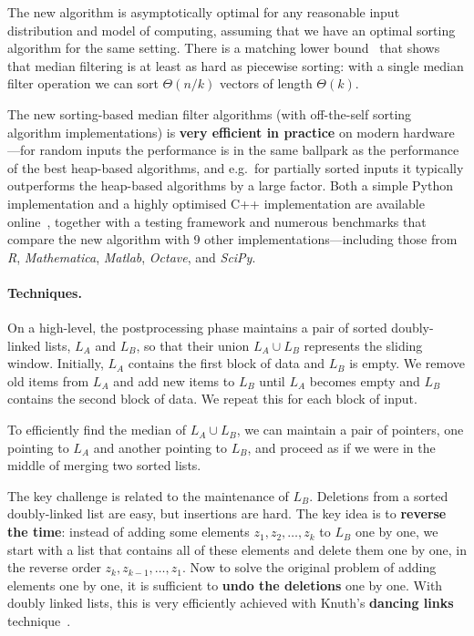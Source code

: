 \documentclass[a4paper,11pt]{article}
\begin{document}
The new algorithm is asymptotically optimal for any reasonable input distribution and model of computing, assuming that we have an optimal sorting algorithm for the same setting. There is a matching lower bound~\cite{juhola91comparison,krizanc05range-mode} that shows that median filtering is at least as hard as piecewise sorting: with a single median filter operation we can sort $\Theta(n/k)$ vectors of length $\Theta(k)$.

The new sorting-based median filter algorithms (with off-the-self sorting algorithm implementations) is \textbf{very efficient in practice} on modern hardware---for random inputs the performance is in the same ballpark as the performance of the best heap-based algorithms, and e.g.\ for partially sorted inputs it typically outperforms the heap-based algorithms by a large factor. Both a simple Python implementation and a highly optimised C++ implementation are available online~, together with a testing framework and numerous benchmarks that compare the new algorithm with 9 other implementations---including those from \emph{R}, \emph{Mathematica}, \emph{Matlab}, \emph{Octave}, and \emph{SciPy}.

\paragraph{Techniques.}

On a high-level, the postprocessing phase maintains a pair of sorted doubly-linked lists, $L_A$ and $L_B$, so that their union $L_A \cup L_B$ represents the sliding window. Initially, $L_A$ contains the first block of data and $L_B$ is empty. We remove old items from $L_A$ and add new items to $L_B$ until $L_A$ becomes empty and $L_B$ contains the second block of data. We repeat this for each block of input.

To efficiently find the median of $L_A \cup L_B$, we can maintain a pair of pointers, one pointing to $L_A$ and another pointing to $L_B$, and proceed as if we were in the middle of merging two sorted lists.

The key challenge is related to the maintenance of $L_B$. Deletions from a sorted doubly-linked list are easy, but insertions are hard. The key idea is to \textbf{reverse the time}: instead of adding some elements $z_1, z_2, \dotsc, z_k$ to $L_B$ one by one, we start with a list that contains all of these elements and delete them one by one, in the reverse order $z_k, z_{k-1}, \dotsc, z_1$. Now to solve the original problem of adding elements one by one, it is sufficient to \textbf{undo the deletions} one by one. With doubly linked lists, this is very efficiently achieved with Knuth's \textbf{dancing links} technique~\cite{knuth00dancinglinks}.
\end{document}

